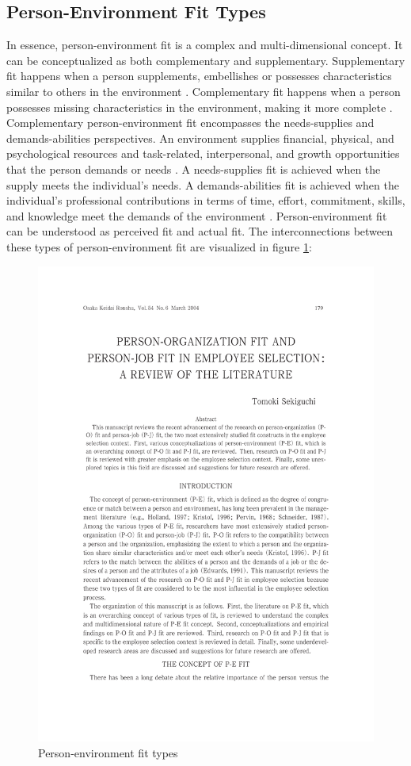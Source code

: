 \documentclass[draft,final]{thesisclass} %
\begin{document}
\subsection{Person-Environment Fit Types} \label{pef_types}
In essence, person-environment fit is a complex and multi-dimensional concept.
It can be conceptualized as both complementary and supplementary.
Supplementary fit happens when a person supplements, embellishes or possesses characteristics similar to others in the environment \parencite[180]{po_and_pj_fit_literature_review}.
Complementary fit happens when a person possesses missing characteristics in the environment, making it more complete \parencite[180]{po_and_pj_fit_literature_review}.
Complementary person-environment fit encompasses the needs-supplies and demands-abilities perspectives.
An environment supplies financial, physical, and psychological resources and task-related, interpersonal, and growth opportunities that the person demands or needs \parencite[180]{po_and_pj_fit_literature_review}.
A needs-supplies fit is achieved when the supply meets the individual's needs.
A demands-abilities fit is achieved when the individual's professional contributions in terms of time, effort, commitment, skills, and knowledge meet the demands of the environment \parencite[180]{po_and_pj_fit_literature_review}.
Person-environment fit can be understood as perceived fit and actual fit.
The interconnections between these types of person-environment fit are visualized in figure \ref{fig:person_environment_fit_types}:
\begin{figure}[H]
    \centering
    \includegraphics[scale=0.5,page=3,width=0.8\linewidth,trim={55 130 55 470},clip]{literature/po_and_pj_fit_literature_review.pdf}
    \caption{Person-environment fit types \parencite[3]{po_and_pj_fit_literature_review}}
    \label{fig:person_environment_fit_types}
\end{figure}
\end{document}

